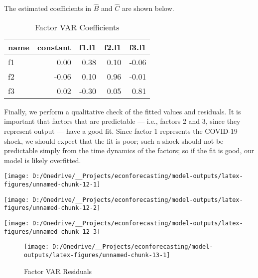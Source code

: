 \documentclass[11pt, letterpaper]{article}\usepackage[]{graphicx}\usepackage[]{color}
\begin{document}
The estimated coefficients in $\widehat{B}$ and $\widehat{C}$ are shown below.
\begin{table}[H]
\centering
\begingroup\footnotesize
\begin{tabular}{lrrrr}
  \hline
name & constant & f1.l1 & f2.l1 & f3.l1 \\ 
  \hline
f1 & 0.00 & 0.38 & 0.10 & -0.06 \\ 
  f2 & -0.06 & 0.10 & 0.96 & -0.01 \\ 
  f3 & 0.02 & -0.30 & 0.05 & 0.81 \\ 
   \hline
\end{tabular}
\endgroup
\caption{Factor VAR Coefficients} 
\end{table}



Finally, we perform a qualitative check of the fitted values and residuals. It is important that factors that are predictable --- i.e., factors 2 and 3, since they represent output --- have a good fit. Since factor 1 represents the COVID-19 shock, we should expect that the fit is poor; such a shock should not be predictable simply from the time dynamics of the factors; so if the fit is good, our model is likely overfitted.


{\centering \texttt{[image: D:/Onedrive/\_\_Projects/econforecasting/model-outputs/latex-figures/unnamed-chunk-12-1]} 

}




{\centering \texttt{[image: D:/Onedrive/\_\_Projects/econforecasting/model-outputs/latex-figures/unnamed-chunk-12-2]} 

}




{\centering \texttt{[image: D:/Onedrive/\_\_Projects/econforecasting/model-outputs/latex-figures/unnamed-chunk-12-3]} 

}





\begin{figure}[H]

{\centering \texttt{[image: D:/Onedrive/\_\_Projects/econforecasting/model-outputs/latex-figures/unnamed-chunk-13-1]} 

}

\caption[Factor VAR Residuals]{Factor VAR Residuals}\label{fig:unnamed-chunk-13}
\end{figure}
\end{document}
